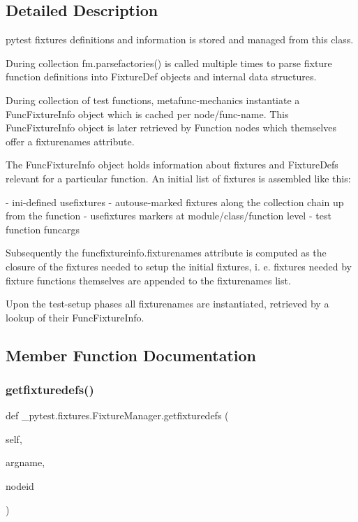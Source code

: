 \subsection{Detailed Description}
\begin{DoxyVerb}pytest fixtures definitions and information is stored and managed
from this class.

During collection fm.parsefactories() is called multiple times to parse
fixture function definitions into FixtureDef objects and internal
data structures.

During collection of test functions, metafunc-mechanics instantiate
a FuncFixtureInfo object which is cached per node/func-name.
This FuncFixtureInfo object is later retrieved by Function nodes
which themselves offer a fixturenames attribute.

The FuncFixtureInfo object holds information about fixtures and FixtureDefs
relevant for a particular function.  An initial list of fixtures is
assembled like this:

- ini-defined usefixtures
- autouse-marked fixtures along the collection chain up from the function
- usefixtures markers at module/class/function level
- test function funcargs

Subsequently the funcfixtureinfo.fixturenames attribute is computed
as the closure of the fixtures needed to setup the initial fixtures,
i. e. fixtures needed by fixture functions themselves are appended
to the fixturenames list.

Upon the test-setup phases all fixturenames are instantiated, retrieved
by a lookup of their FuncFixtureInfo.
\end{DoxyVerb}
 

\subsection{Member Function Documentation}
\mbox{\label{class__pytest_1_1fixtures_1_1_fixture_manager_a723def2e14db66ba209fe4071bfddeed}} 
\subsubsection{\texorpdfstring{getfixturedefs()}{getfixturedefs()}}
{\footnotesize\ttfamily def \+\_\+pytest.\+fixtures.\+Fixture\+Manager.\+getfixturedefs (\begin{DoxyParamCaption}\item[{}]{self,  }\item[{}]{argname,  }\item[{}]{nodeid }\end{DoxyParamCaption})}

